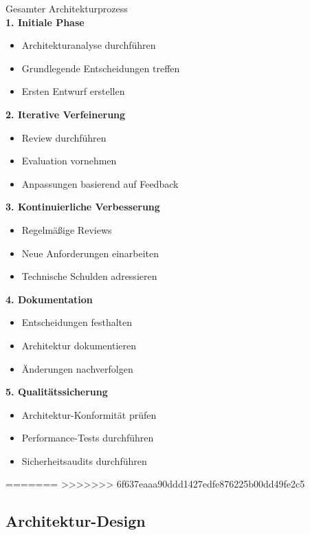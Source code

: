 \begin{KR}{Gesamter Architekturprozess}\\
\textbf{1. Initiale Phase}
\begin{itemize}
    \item Architekturanalyse durchführen
    \item Grundlegende Entscheidungen treffen
    \item Ersten Entwurf erstellen
\end{itemize}

\textbf{2. Iterative Verfeinerung}
\begin{itemize}
    \item Review durchführen
    \item Evaluation vornehmen
    \item Anpassungen basierend auf Feedback
\end{itemize}

\textbf{3. Kontinuierliche Verbesserung}
\begin{itemize}
    \item Regelmäßige Reviews
    \item Neue Anforderungen einarbeiten
    \item Technische Schulden adressieren
\end{itemize}

\textbf{4. Dokumentation}
\begin{itemize}
    \item Entscheidungen festhalten
    \item Architektur dokumentieren
    \item Änderungen nachverfolgen
\end{itemize}

\textbf{5. Qualitätssicherung}
\begin{itemize}
    \item Architektur-Konformität prüfen
    \item Performance-Tests durchführen
    \item Sicherheitsaudits durchführen
\end{itemize}
\end{KR}
=======
\pagebreak
>>>>>>> 6f637eaaa90ddd1427edfe876225b00dd49fe2c5

\subsection{Architektur-Design}

